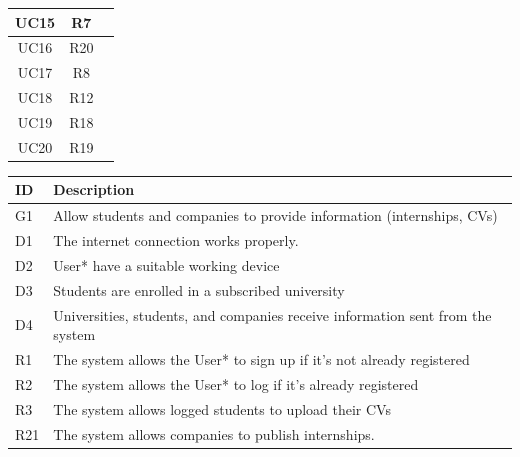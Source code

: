 \begin{center}
\begin{tabular}{|c|c|c|}
        UC15 & R7 \\ \hline
        \rowcolor[HTML]{F0F0F0} %
        UC16 & R20\\ \hline
        \rowcolor[HTML]{FFFFFF} %
        UC17 & R8\\ \hline
        \rowcolor[HTML]{F0F0F0} %
        UC18 & R12\\ \hline
        \rowcolor[HTML]{FFFFFF} %
        UC19 & R18\\ \hline
        \rowcolor[HTML]{F0F0F0} %
        UC20 & R19\\ \hline
    \end{tabular}
\end{center}

\setcounter{g}{1}

\begin{center}
    \begin{longtable}{|l|p{13.5cm}|}
        \hline
        \rowcolor[HTML]{5C8A99}
        \textbf{ID} & \textbf{Description} \\ \hline
        \rowcolor[HTML]{E7E0FA} %
        G1 & Allow students and companies to provide information (internships, CVs) \\ \hline
        \rowcolor[HTML]{FFF9C4} %
        D1 & The internet connection works properly. \\ \hline
        \rowcolor[HTML]{FFF9C4} %
        D2 & User* have a suitable working device \\ \hline
        \rowcolor[HTML]{FFF9C4} %
        D3 & Students are enrolled in a subscribed university \\ \hline
        \rowcolor[HTML]{FFF9C4} %
        D4 & Universities, students, and companies receive information sent from the system \\ \hline
        \hline\rowcolor[HTML]{FFDAB9} %
        R1 & The system allows the User* to sign up if it’s not already registered \\ \hline
        \hline\rowcolor[HTML]{FFDAB9} %
        R2 & The system allows the User* to log if it’s already registered \\ \hline
        \hline\rowcolor[HTML]{FFDAB9} %
        R3 & The system allows logged students to upload their CVs \\ \hline
        \hline\rowcolor[HTML]{FFDAB9} %
        R21 & The system allows companies to publish internships. \\ \hline
    \end{longtable}
\end{center}

